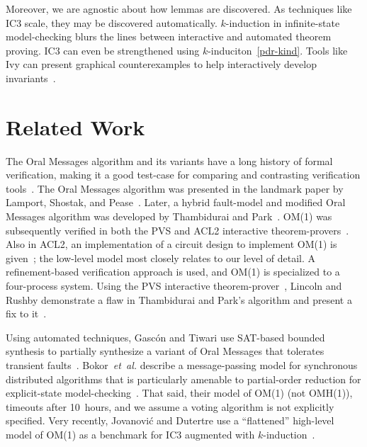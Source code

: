 \documentclass{llncs/llncs}
\newcommand{\lee}[1]{ } %
\newcommand{\lee}[1]{ {\color{blue}$<$lee: #1$>$} } %
\begin{document}
Moreover, we are agnostic about how lemmas are discovered. As techniques like IC3 scale, they may be discovered automatically. $k$-induction in infinite-state model-checking blurs the lines between interactive and automated theorem proving. IC3 can even be strengthened using $k$-induciton~\ref{pdr-kind}. Tools like Ivy can present graphical counterexamples to help interactively develop invariants~\cite{ivy}.

\section{Related Work}\label{sec:related}

The Oral Messages algorithm and its variants have a long history of formal verification, making it a good test-case for comparing and contrasting verification tools~\cite{pvs}. The Oral Messages algorithm was presented in the landmark paper by Lamport, Shostak, and Pease~\cite{om}. Later, a hybrid fault-model and modified Oral Messages algorithm was developed by Thambidurai and Park~\cite{hybrid}. OM(1) was subsequently verified in both the PVS and ACL2 interactive theorem-provers~\cite{Young97:IC}. Also in ACL2, an implementation of a circuit design to implement OM(1) is given~\cite{om-acl2-impl}; the low-level model most closely relates to our level of detail. A refinement-based verification approach is used, and OM(1) is specialized to a four-process system. Using the PVS interactive theorem-prover~\cite{pvs}, Lincoln and Rushby demonstrate a flaw in Thambidurai and Park's algorithm and present a fix to it~\cite{csl-93-2}.

Using automated techniques, Gasc{\'{o}}n and Tiwari use SAT-based bounded synthesis to partially synthesize a variant of Oral Messages that tolerates transient faults~\cite{om1-synth}. Bokor~\emph{et~al.} describe a message-passing model for synchronous distributed algorithms that is particularly amenable to partial-order reduction for explicit-state model-checking~\cite{Bokor2010}. That said, their model of OM(1) (not OMH(1)), timeouts after 10~hours, and we assume a voting algorithm is not explicitly specified. \lee{for what size? Also, Rushby's model?} Very recently, Jovanovi{\'{c}} and Dutertre use a ``flattened'' high-level model of OM(1) as a benchmark for IC3 augmented with $k$-induction~\cite{pdr-kind}.

\lee{mention that ASMs similar to disjunction invariants}
\end{document}
